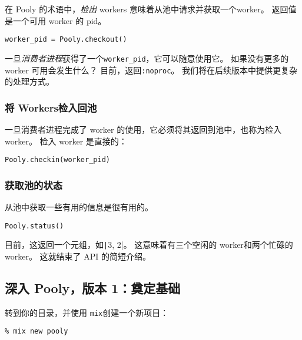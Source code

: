 在 Pooly 的术语中，\emph{检出} workers 意味着从池中请求并获取一个worker。
返回值是一个可用 worker 的 pid。

\begin{code}{}
\begin{verbatim}
worker_pid = Pooly.checkout()
\end{verbatim}
\end{code}

一旦\emph{消费者进程}获得了一个\texttt{worker\_pid}，它可以随意使用它。
如果没有更多的worker 可用会发生什么？
目前，返回\texttt{:noproc}。
我们将在后续版本中提供更复杂的处理方式。


\subsubsection{将 Workers检入回池}

一旦消费者进程完成了 worker 的使用，它必须将其返回到池中，也称为检入worker。
检入 worker 是直接的：

\begin{code}{}
\begin{verbatim}
Pooly.checkin(worker_pid)
\end{verbatim}
\end{code}


\subsubsection{获取池的状态}

从池中获取一些有用的信息是很有用的。

\begin{code}{}
\begin{verbatim}
Pooly.status()
\end{verbatim}
\end{code}

目前，这返回一个元组，如\texttt|{3, 2}|。
这意味着有三个空闲的 worker和两个忙碌的 worker。
这就结束了 API 的简短介绍。

\subsection{深入 Pooly，版本 1：奠定基础}

转到你的目录，并使用 \texttt{mix}创建一个新项目：

\begin{code}{}
\begin{verbatim}
% mix new pooly
\end{verbatim}
\end{code}



